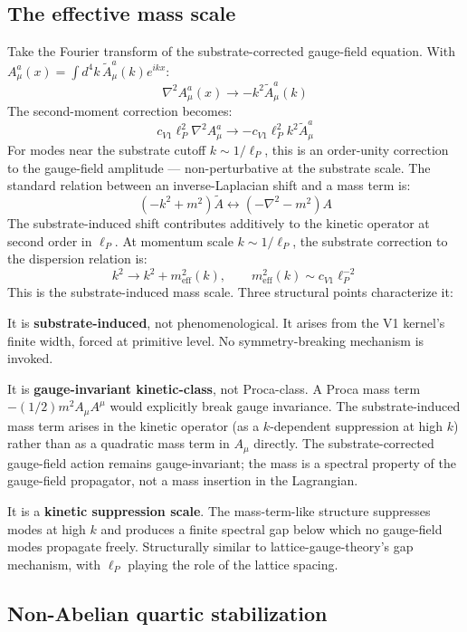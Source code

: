\documentclass[11pt,a4paper]{article}
\begin{document}
\subsection{The effective mass scale}

Take the Fourier transform of the substrate-corrected gauge-field equation. With $A_\mu^a(x) = \int d^{4}k\, \tilde A_\mu^a(k) e^{ikx}$:
\[
\nabla^{2} A_\mu^a(x) \to -k^{2} \tilde A_\mu^a(k)
\]
The second-moment correction becomes:
\[
c_{V1} \ell_P^{2} \nabla^{2} A_\mu^a \to -c_{V1} \ell_P^{2} k^{2} \tilde A_\mu^a
\]
For modes near the substrate cutoff $k \sim 1/\ell_P$, this is an order-unity correction to the gauge-field amplitude --- non-perturbative at the substrate scale. The standard relation between an inverse-Laplacian shift and a mass term is:
\[
(-k^{2} + m^{2}) \tilde A \leftrightarrow (-\nabla^{2} - m^{2}) A
\]
The substrate-induced shift contributes additively to the kinetic operator at second order in $\ell_P$. At momentum scale $k \sim 1/\ell_P$, the substrate correction to the dispersion relation is:
\[
k^{2} \to k^{2} + m_\mathrm{eff}^{2}(k), \qquad m_\mathrm{eff}^{2}(k) \sim c_{V1} \ell_P^{-2}
\]
This is the substrate-induced mass scale. Three structural points characterize it:

It is \textbf{substrate-induced}, not phenomenological. It arises from the V1 kernel's finite width, forced at primitive level. No symmetry-breaking mechanism is invoked.

It is \textbf{gauge-invariant kinetic-class}, not Proca-class. A Proca mass term $-(1/2) m^{2} A_\mu A^\mu$ would explicitly break gauge invariance. The substrate-induced mass term arises in the kinetic operator (as a $k$-dependent suppression at high $k$) rather than as a quadratic mass term in $A_\mu$ directly. The substrate-corrected gauge-field action remains gauge-invariant; the mass is a spectral property of the gauge-field propagator, not a mass insertion in the Lagrangian.

It is a \textbf{kinetic suppression scale}. The mass-term-like structure suppresses modes at high $k$ and produces a finite spectral gap below which no gauge-field modes propagate freely. Structurally similar to lattice-gauge-theory's gap mechanism, with $\ell_P$ playing the role of the lattice spacing.

\subsection{Non-Abelian quartic stabilization}
\end{document}
